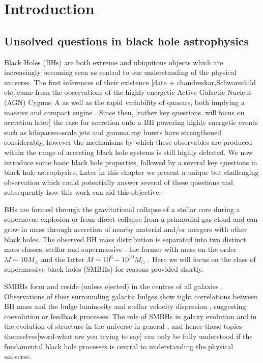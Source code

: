 \chapter{Introduction}

\section{Unsolved questions in black hole astrophysics}
Black Holes (BHs) are both extreme and ubiquitous objects which are increasingly becoming seen as central to our understanding of the physical universe. The first inferences of their existence [date + chandreskar,Schwarschild etc.]came from the observations of the highly energetic Active Galactic Nucleus (AGN) Cygnus~A as well as the rapid variability of quasars, both implying a massive and compact engine \citep[][and references therein]{Narayan_2013}. Since then, [rather key questions, will focus on accretion later] the case for accretion onto a BH powering highly energetic events such as kiloparsec-scale jets and gamma ray bursts have strengthened considerably, however the mechanisms by which these observables are produced within the range of accreting black hole systems is still highly debated. We now introduce some basic black hole properties, followed by a several key questions in black hole astrophysics. Later in this chapter we present a unique but challenging observation which could potentially answer several of these questions and subsequently how this work can aid this objective. 


BHs are formed through the gravitational collapse of a stellar core during a supernovae explosion or from direct collapse from a primordial gas cloud and can grow in mass through accretion of nearby material and/or mergers with other black holes. The observed BH mass distribution is separated into two distinct mass classes, stellar and supermassive - the former with mass on the order $M \sim 10 M_\odot$ and the latter $M \sim 10^6 - 10^{10} M_\odot$ \citep{Falcke_2013}. Here we will focus on the class of supermassive black holes (SMBHs) for reasons provided shortly.


SMBHs form and reside (unless ejected) in the centres of all galaxies \citep{Kormendy_1995}. Observations of their surrounding galactic bulges show tight correlations between BH mass and the bulge luminosity and stellar velocity dispersion \citep{Magorrian_1998,Gebhardt_2000}, suggesting coevolution or feedback processes. The role of SMBHs in galaxy evolution and in the evolution of structure in the universe in general \citep{Volonteri_2003}, and hence those topics themselves[word-what are you trying to say] can only be fully understood if the fundamental black hole processes is central to understanding the physical universe. 


